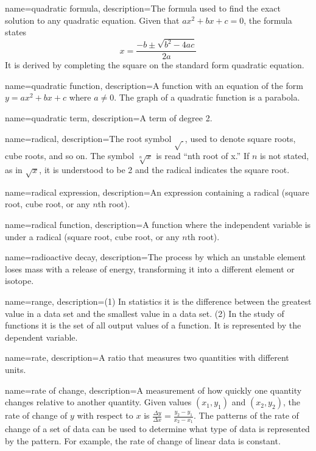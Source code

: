  {
	name=quadratic formula,
	description={The formula used to find the exact solution to any quadratic equation. Given that $ax^2+bx+c=0$, the formula states \[x = \frac{-b \pm \sqrt{b^2 - 4ac}}{2a}\] It is derived by completing the square on the standard form quadratic equation.}
}

 {
	name=quadratic function,
	description={A function with an equation of the form $y = ax^2 + bx + c$ where $a \neq 0$. The graph of a quadratic function is a \gls{parabola}.}
}

 {
	name=quadratic term,
	description={A term of degree 2.}
}

 {
	name=radical,
	description={The root symbol $\sqrt{~}$, used to denote square roots, cube roots, and so on. The symbol $\sqrt[n]{x}$ is read ``nth root of x.'' If $n$ is not stated, as in $\sqrt{x}$, it is understood to be 2 and the radical indicates the square root.}
}

 {
	name=radical expression,
	description={An expression containing a radical (square root, cube root, or any $n$th root).}
}

 {
	name=radical function,
	description={A function where the independent variable is under a radical (square root, cube root, or any $n$th root).}
}

 {
	name=radioactive decay,
	description={The process by which an unstable element loses mass with a release of energy, transforming it into a different element or isotope.}
}

 {
	name=range,
	description={(1) In statistics it is the difference between the greatest value in a data set and the smallest value in a data set. (2) In the study of functions it is the set of all output values of a function. It is represented by the dependent variable.}
}

 {
	name=rate,
	description={A \gls{ratio} that measures two quantities with different units.}
}

 {
	name=rate of change,
	description={A measurement of how quickly one quantity changes relative to another quantity. Given values $(x_1,y_1)$ and $(x_2,y_2)$, the rate of change of $y$ with respect to $x$ is $\frac{\Delta y}{\Delta x} = \frac{y_2-y_1}{x_2-x_1}$. The patterns of the rate of change of a set of data can be used to determine what type of data is represented by the pattern. For example, the rate of change of linear data is constant.}
}

